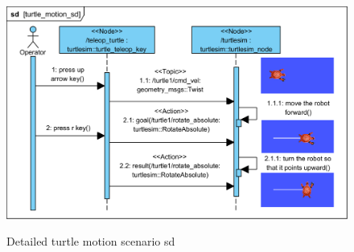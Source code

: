 \documentclass[11pt,oneside,a4paper]{report}
\begin{document}
\begin{figure}[H]
	\centering
	\begin{center}
		{\includegraphics[scale=1.0]{diagrams/turtle_motion_sd.png}}
	\end{center}
	\caption{Detailed turtle motion scenario sd}
	\label{fig:turtle_motion_sd}
\end{figure}
			
\AtNextBibliography{\small}
\printbibliography
	
\end{document}
